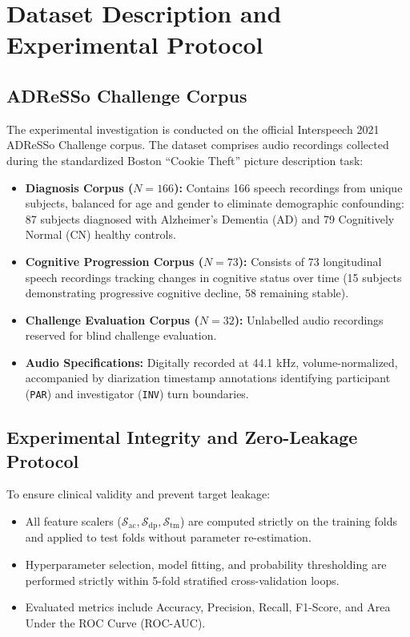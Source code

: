 \documentclass[conference]{IEEEtran}
\begin{document}
\section{Dataset Description and Experimental Protocol}

\subsection{ADReSSo Challenge Corpus}
The experimental investigation is conducted on the official Interspeech 2021 ADReSSo Challenge corpus. The dataset comprises audio recordings collected during the standardized Boston ``Cookie Theft'' picture description task:
\begin{itemize}
    \item \textbf{Diagnosis Corpus ($N = 166$):} Contains 166 speech recordings from unique subjects, balanced for age and gender to eliminate demographic confounding: 87 subjects diagnosed with Alzheimer's Dementia (AD) and 79 Cognitively Normal (CN) healthy controls.
    \item \textbf{Cognitive Progression Corpus ($N = 73$):} Consists of 73 longitudinal speech recordings tracking changes in cognitive status over time (15 subjects demonstrating progressive cognitive decline, 58 remaining stable).
    \item \textbf{Challenge Evaluation Corpus ($N = 32$):} Unlabelled audio recordings reserved for blind challenge evaluation.
    \item \textbf{Audio Specifications:} Digitally recorded at 44.1 kHz, volume-normalized, accompanied by diarization timestamp annotations identifying participant (\texttt{PAR}) and investigator (\texttt{INV}) turn boundaries.
\end{itemize}

\subsection{Experimental Integrity and Zero-Leakage Protocol}
To ensure clinical validity and prevent target leakage:
\begin{itemize}
    \item All feature scalers ($\mathcal{S}_{\text{ac}}, \mathcal{S}_{\text{dp}}, \mathcal{S}_{\text{tm}}$) are computed strictly on the training folds and applied to test folds without parameter re-estimation.
    \item Hyperparameter selection, model fitting, and probability thresholding are performed strictly within 5-fold stratified cross-validation loops.
    \item Evaluated metrics include Accuracy, Precision, Recall, F1-Score, and Area Under the ROC Curve (ROC-AUC).
\end{itemize}
\end{document}

